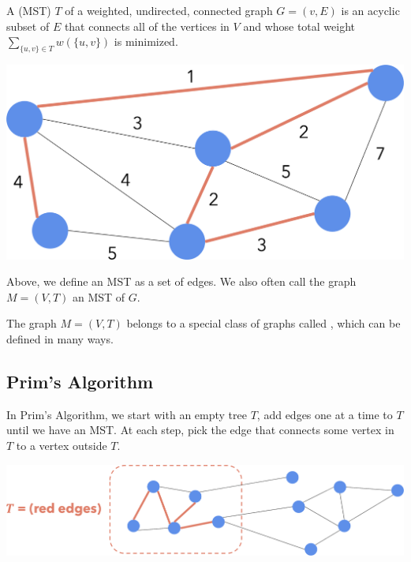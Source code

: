 A  (MST) $T$ of a weighted, undirected, connected graph $G = (v, E)$ is an acyclic subset of $E$ that connects all of the vertices in $V$ and whose total weight $\displaystyle \sum_{\{u,v\} \in T} w(\{ u, v \} )$ is minimized.

\begin{center} \includegraphics[width=0.5\linewidth]{images/Minimum-Spanning-Tree.png} \end{center}

Above, we define an MST as a set of edges. We also often call the graph $M = (V, T)$ an MST of $G$.

The graph $M = (V, T)$ belongs to a special class of graphs called , which can be defined in many ways.

\subsection{Prim's Algorithm}

In Prim's Algorithm, we start with an empty tree $T$, add edges one at a time to $T$ until we have an MST. At each step, pick the  edge that connects some vertex in $T$ to a vertex outside $T$. 

\begin{center} \includegraphics[width=0.5\linewidth]{images/Prims-Algorithm.png} \end{center}

